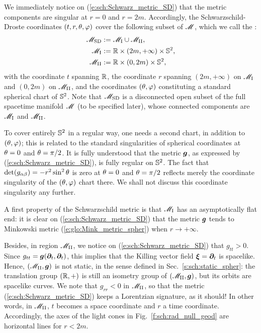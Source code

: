 We immediately notice on (\ref{e:sch:Schwarz_metric_SD}) that the metric
components are singular at $r=0$ and $r=2m$. Accordingly, the Schwarzschild-Droste coordinates $(t,r,\theta,\varphi)$ cover the following subset of $\mathscr{M}$, which we call the
:
\begin{subequations}
\begin{align}
    \mathscr{M}_{\rm SD} & :=  \mathscr{M}_{\rm I} \cup \mathscr{M}_{\rm II} , \\
    \mathscr{M}_{\rm I} & :=  \mathbb{R}\times(2m,+\infty)\times\mathbb{S}^2 ,\\
    \mathscr{M}_{\rm II} & :=  \mathbb{R}\times(0,2m)\times\mathbb{S}^2 ,
\end{align}
\end{subequations}
with the coordinate $t$ spanning $\mathbb{R}$, the coordinate $r$ spanning $(2m,+\infty)$
on $\mathscr{M}_{\rm I}$ and $(0,2m)$ on $\mathscr{M}_{\rm II}$, and the coordinates $(\theta,\varphi)$
constituting a standard spherical chart of $\mathbb{S}^2$.
Note that $\mathscr{M}_{\rm SD}$ is a disconnected open subset of the full spacetime
manifold $\mathscr{M}$ (to be specified later), whose connected components are
$\mathscr{M}_{\rm I}$ and $\mathscr{M}_{\rm II}$.

\begin{remark}
To cover entirely $\mathbb{S}^2$ in a regular way, one needs a second chart, in
addition to $(\theta,\varphi)$; this is related to the standard singularities of
spherical coordinates at $\theta=0$ and $\theta=\pi/2$. It is fully understood
that the metric $\bm{g}$, as expressed by (\ref{e:sch:Schwarz_metric_SD}), is
fully regular on $\mathbb{S}^2$. The fact that $\det(g_{\alpha\beta}) = -r^2\sin^2\theta$ is zero
at $\theta=0$ and $\theta=\pi/2$ reflects merely the coordinate singularity
of the $(\theta,\varphi)$ chart there. We shall not discuss this coordinate singularity
any further.
\end{remark}

A first property of the Schwarzschild metric is that $\mathscr{M}_{\rm I}$ has an
asymptotically flat end: it is clear on (\ref{e:sch:Schwarz_metric_SD})
that the metric $\bm{g}$ tends to Minkowski metric (\ref{e:glo:Mink_metric_spher})
when $r\rightarrow +\infty$.

Besides, in region $\mathscr{M}_{\rm II}$, we notice on (\ref{e:sch:Schwarz_metric_SD})
that $g_{tt} > 0$. Since $g_{tt} = \bm{g}(\bm{\partial}_t,\bm{\partial}_t)$, this implies
that the Killing vector field $\bm{\xi} = \bm{\partial}_t$ is spacelike. Hence,
$(\mathscr{M}_{\rm II},\bm{g})$ is not static, in the sense defined in
Sec.~\ref{s:sch:static_spher}: the translation group $(\mathbb{R},+)$ is still an
isometry group of $(\mathscr{M}_{\rm II},\bm{g})$, but its orbits are spacelike curves.
We note that $g_{rr} < 0$ in $\mathscr{M}_{\rm II}$, so that the
metric (\ref{e:sch:Schwarz_metric_SD}) keeps a Lorentzian signature,
as it should!
In other words, in $\mathscr{M}_{\rm II}$, $t$ becomes a space coordinate and
$r$ a time coordinate. Accordingly, the axes of the light cones
in Fig.~\ref{f:sch:rad_null_geod} are horizontal lines for $r<2m$.

